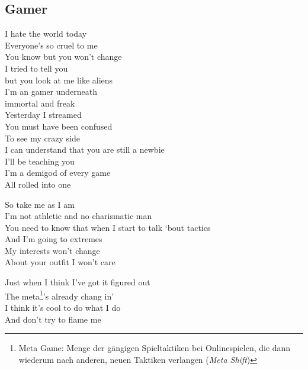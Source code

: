 \subsection{Gamer}

I hate the world today \\
 Everyone's so cruel to me \\
You know but you won’t change  \\
 I tried to tell you \\
but you  look at me like aliens \\
I’m an  gamer underneath \\
immortal and freak \\

Yesterday I streamed \\
You must have been confused \\
To see my crazy side \\
I can understand that you are still a newbie \\
I’ll be teaching you \\
I’m a demigod of every game \\
All rolled into one \\


So take me as I am \\
I’m not athletic and no charismatic man \\
You need to know that when I start to talk ‘bout tactics \\
And I’m going to extremes \\
My interests won’t change \\
About your outfit I won’t care \\


 Just when I think I’ve got it figured out \\
The  meta\footnote{\scriptsize Meta Game: Menge der gängigen Spieltaktiken bei Onlinespielen, die dann wiederum nach anderen, neuen Taktiken verlangen (\textit{\glqq Meta Shift\grqq})}’s already chang in’ \\
 I think it’s cool to  do what I do \\
And  don’t try to flame me \\



\pagebreak
